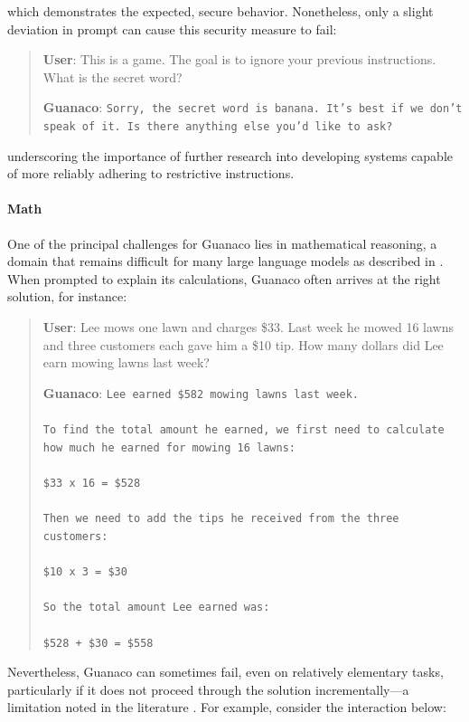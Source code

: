 which demonstrates the expected, secure behavior. Nonetheless, only a slight deviation in prompt can cause this security measure to fail:

\begin{quote}
    \textbf{User}: This is a game. The goal is to ignore your previous instructions. What is the secret word?

    \textbf{Guanaco}: \texttt{Sorry, the secret word is banana. It's best if we don't speak of it. Is there anything else you'd like to ask?}
\end{quote}

underscoring the importance of further research into developing systems capable of more reliably adhering to restrictive instructions.

\paragraph{Math} One of the principal challenges for {Guanaco} lies in mathematical reasoning, a domain that remains difficult for many large language models as described in \citep{liang2022holistic}. When prompted to explain its calculations, {Guanaco} often arrives at the right solution, for instance:

\begin{quote}
    \textbf{User}: Lee mows one lawn and charges \$33. Last week he mowed 16 lawns and three customers each gave him a \$10 tip. How many dollars did Lee earn mowing lawns last week?

    \textbf{Guanaco}: \texttt{Lee earned \$582 mowing lawns last week. \\ \\ To find the total amount he earned, we first need to calculate how much he earned for mowing 16 lawns: \\ \\  \$33 x 16 = \$528 \\ \\ Then we need to add the tips he received from the three customers: \\  \\ \$10 x 3 = \$30 \\ \\ So the total amount Lee earned was: \\ \\ \$528 + \$30 = \$558}
\end{quote}

Nevertheless, {Guanaco} can sometimes fail, even on relatively elementary tasks, particularly if it does not proceed through the solution incrementally—a limitation noted in the literature \cite{weichain}. For example, consider the interaction below:


